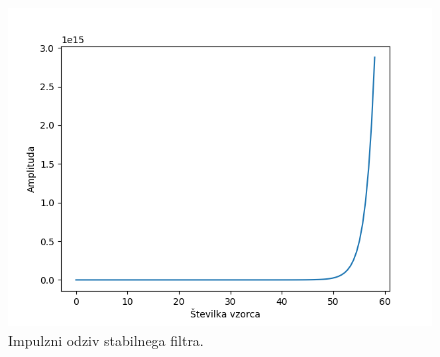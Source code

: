 \documentclass[a4paper,11pt]{article}
\begin{document}
\begin{figure}[htbp]
\begin{center}
\includegraphics[scale=0.7]{images/impulse-response_after.png}
\caption{Impulzni odziv stabilnega filtra.}
\label{reimp_after}
\end{center}
\end{figure}


\end{document}
